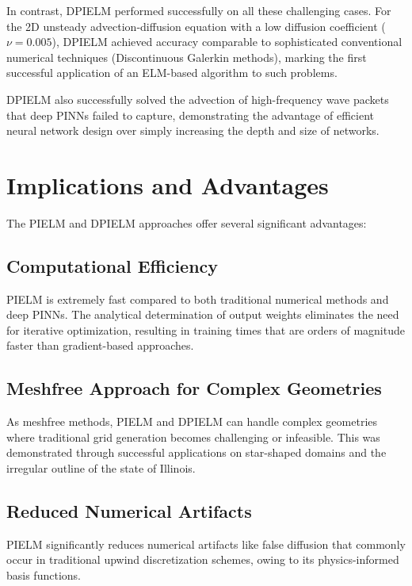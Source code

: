 \documentclass[11pt]{article}
\begin{document}
In contrast, DPIELM performed successfully on all these challenging cases. For the 2D unsteady advection-diffusion equation with a low diffusion coefficient ($\nu = 0.005$), DPIELM achieved accuracy comparable to sophisticated conventional numerical techniques (Discontinuous Galerkin methods), marking the first successful application of an ELM-based algorithm to such problems.

DPIELM also successfully solved the advection of high-frequency wave packets that deep PINNs failed to capture, demonstrating the advantage of efficient neural network design over simply increasing the depth and size of networks.

\section{Implications and Advantages}

The PIELM and DPIELM approaches offer several significant advantages:

\subsection{Computational Efficiency}

PIELM is extremely fast compared to both traditional numerical methods and deep PINNs. The analytical determination of output weights eliminates the need for iterative optimization, resulting in training times that are orders of magnitude faster than gradient-based approaches.

\subsection{Meshfree Approach for Complex Geometries}

As meshfree methods, PIELM and DPIELM can handle complex geometries where traditional grid generation becomes challenging or infeasible. This was demonstrated through successful applications on star-shaped domains and the irregular outline of the state of Illinois.

\subsection{Reduced Numerical Artifacts}

PIELM significantly reduces numerical artifacts like false diffusion that commonly occur in traditional upwind discretization schemes, owing to its physics-informed basis functions.
\end{document}
